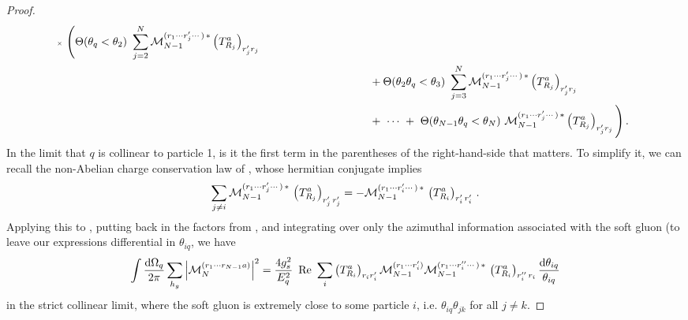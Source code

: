 \begin{proof}
\begin{align}
        \,\,\,
        {\scriptscriptstyle\times}
        \,\,
        \Bigg(
            \Theta(\theta_q < \theta_2)
            \,\,
            \sum_{j=2}^N
            \mathcal{M}_{N-1}^{(r_1\cdots r'_j \cdots )\,*}
            \left(T^a_{R_j}\right)_{r'_j r_j}
            \\
            & \notag
            \qquad\qquad\qquad\qquad\qquad
            +
            \Theta(\theta_2 \theta_q < \theta_3)
            \,\,
            \sum_{j=3}^N
            \mathcal{M}_{N-1}^{(r_1\cdots r'_j \cdots )\,*}
            \left(T^a_{R_j}\right)_{r'_j r_j}
            \\
            & \notag
            \qquad\qquad\qquad\qquad\qquad
            +
            \,\,\cdots\,\,+\,\,
            \Theta(\theta_{N-1} \theta_q < \theta_N)
            \,\,
            \mathcal{M}_{N-1}^{(r_1\cdots r'_j \cdots )\,*}
            \left(T^a_{R_j}\right)_{r'_j r_j}
        \Bigg)
        \,.
    \end{align}
    In the limit that \(q\) is collinear to particle 1, is it the first term in the parentheses of the right-hand-side that matters.
    To simplify it, we can recall the non-Abelian charge conservation law of , whose hermitian conjugate implies
    \begin{align}
        \sum_{j \neq i}
        \mathcal{M}_{N-1}
        ^{(r_1\cdots r'_j\cdots )\, *}
        \,
        \le(T^a_{R_j}\ri)\indices{_{r'_j\,r'_j}}
        =
        -
        \mathcal{M}_{N-1}
        ^{(r_1\cdots r'_i\cdots )\, *}
        \,
        \le(T^a_{R_i}\ri)\indices{_{r'_i\,r'_i}}
        \,.
    \end{align}
    Applying this to , putting back in the factors from , and integrating over only the azimuthal information associated with the soft gluon (to leave our expressions differential in \(\theta_{iq}\), we have
    \begin{align}
        \int \frac{\dd\Omega_q}{2\pi}
        \sum_{h_g}
        \abs{\mathcal{M}_N^{(r_1\cdots r_{N-1}a)}}^2
        =
        \frac{4 g_s^2}{E_q^2}
        \,\,
        \Re
        \,\,
        \sum_i
        \le(T^a_{R_i}\ri)_{r_i r'_i}
        \mathcal{M}_{N-1}^{(r_1\cdots r'_i)}
        \mathcal{M}_{N-1}^{(r_1\cdots r''_i\cdots )\, *}
        \,
        \le(T^a_{R_i}\ri)\indices{_{r''_i\,r_i}}
        \frac{\dd\theta_{iq}}{\theta_{iq}}
    \end{align}
    in the strict collinear limit, where the soft gluon is extremely close to some particle \(i\), i.e. \(\theta_{iq} \theta_{jk}\) for all \(j \neq k\).



\end{proof}
